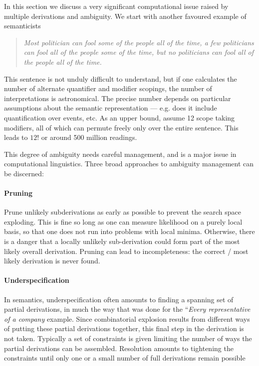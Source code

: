 In this section we discuss a very significant computational issue raised
by multiple derivations and ambiguity.  We start with another favoured
example of semanticists
\begin{quote}
{\it Most politician can fool some of the people all of the time, a few
politicians can fool all of the people some of the time, but no politicians
can fool all of the people all of the time.}
\end{quote}
This sentence is not unduly difficult to understand, but if one calculates
the number of alternate quantifier and modifier scopings, the number
of interpretations is astronomical. The precise number depends on
particular assumptions about the semantic representation --- e.g. does
it include quantification over events, etc.  As an upper bound, assume
12 scope taking modifiers, all of which can permute freely only over the
entire sentence.  This leads to $12!$ or around 500 million readings.

This degree of ambiguity needs careful management, and 
is a major issue in computational linguistics.  Three broad approaches
to ambiguity management can be discerned:

\paragraph{Pruning}
Prune unlikely subderivations as early as possible to prevent the search
space exploding.  This is fine so long as one can measure likelihood
on a purely local basis, so that one does not run into problems with
local minima.  Otherwise, there is a danger that a locally unlikely 
sub-derivation could form part of the most likely overall derivation. 
Pruning can lead to incompleteness: the correct / most likely derivation
is never found. 

\paragraph{Underspecification}
In semantics, underspecification often amounts to finding a spanning
set of partial derivations, in much the way that was done for the
``{\it Every representative of a company} example.  Since combinatorial
explosion results from different ways of putting these partial derivations
together, this final step in the derivation is not taken.  Typically a
set of constraints is given limiting the number of ways the partial
derivations can be assembled.  Resolution amounts to tightening the
constraints until only one or a small number of full derivations remain
possible

